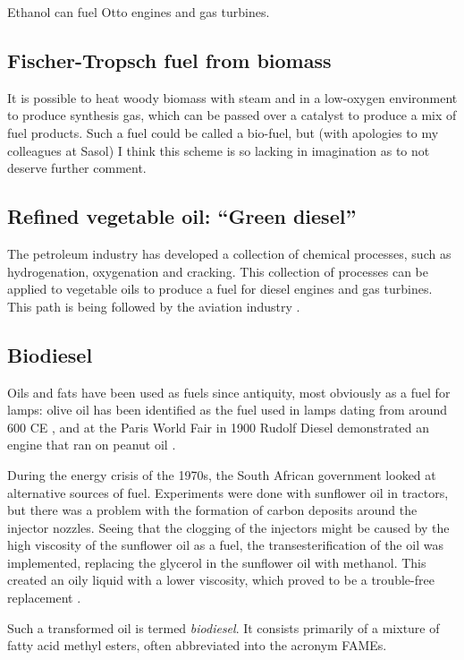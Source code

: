 Ethanol can fuel Otto engines and gas turbines. 

\subsection{Fischer-Tropsch fuel from biomass}

It is possible to heat woody biomass with steam and in a low-oxygen environment
to produce synthesis gas, which can be passed over a catalyst to produce a mix
of fuel products. Such a fuel could be called a bio-fuel, but (with apologies to
my colleagues at Sasol) I think this scheme is so lacking in imagination as to
not deserve further comment.

\subsection{Refined vegetable oil: ``Green diesel''}

The petroleum industry has developed a collection of chemical processes, such as
hydrogenation, oxygenation and cracking. This collection of processes can be
applied to vegetable oils to produce a fuel for diesel engines and gas turbines.
This path is being followed by the aviation industry \autocite{Chiaramonti2014}.

\subsection{Biodiesel}

Oils and fats have been used as fuels since antiquity, most obviously as a fuel
for lamps: olive oil has been identified as the fuel used in lamps dating from
around 600 CE \autocite{Kimpe2001}, and at the Paris World Fair in 1900 Rudolf
Diesel demonstrated an engine that ran on peanut oil \autocite{Knothe2010}.

During the energy crisis of the 1970s, the South African government looked at
alternative sources of fuel. Experiments were done with sunflower oil in
tractors, but there was a problem with the formation of carbon deposits around
the injector nozzles. Seeing that the clogging of the injectors might be caused
by the high viscosity of the sunflower oil as a fuel, the transesterification of
the oil was implemented, replacing the glycerol in the sunflower oil with
methanol. This created an oily liquid with a lower viscosity, which proved to be
a trouble-free replacement \autocite{VanNiekerk1980}.

Such a transformed oil is termed \textit{biodiesel}. It consists primarily of a
mixture of fatty acid methyl esters, often abbreviated into the acronym FAMEs.

